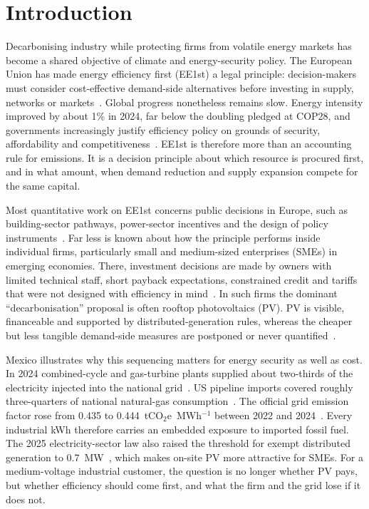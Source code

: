 \documentclass[processes,article,submit,pdftex,moreauthors]{Definitions/mdpi}
\begin{document}
\section{Introduction}
\label{sec:intro}

Decarbonising industry while protecting firms from volatile energy markets has become a shared objective of climate and energy-security policy. The European Union has made energy efficiency first (EE1st) a legal principle: decision-makers must consider cost-effective demand-side alternatives before investing in supply, networks or markets~\cite{eu2023eed,ec2021ee1st,ec2024ee1st}. Global progress nonetheless remains slow. Energy intensity improved by about 1\% in 2024, far below the doubling pledged at COP28, and governments increasingly justify efficiency policy on grounds of security, affordability and competitiveness~\cite{iea2024ee,iea2025ee}. EE1st is therefore more than an accounting rule for emissions. It is a decision principle about which resource is procured first, and in what amount, when demand reduction and supply expansion compete for the same capital.

Most quantitative work on EE1st concerns public decisions in Europe, such as building-sector pathways, power-sector incentives and the design of policy instruments~\cite{mandel2022,pato2022,mandel2023,mandel2024}. Far less is known about how the principle performs inside individual firms, particularly small and medium-sized enterprises (SMEs) in emerging economies. There, investment decisions are made by owners with limited technical staff, short payback expectations, constrained credit and tariffs that were not designed with efficiency in mind~\cite{cagno2013,trianni2017,kalantzis2019,zhang2025credit,herce2024}. In such firms the dominant ``decarbonisation'' proposal is often rooftop photovoltaics (PV). PV is visible, financeable and supported by distributed-generation rules, whereas the cheaper but less tangible demand-side measures are postponed or never quantified~\cite{fleiter2012,thollander2025}.

Mexico illustrates why this sequencing matters for energy security as well as cost. In 2024 combined-cycle and gas-turbine plants supplied about two-thirds of the electricity injected into the national grid~\cite{sener2025plan}. US pipeline imports covered roughly three-quarters of national natural-gas consumption~\cite{eia2025mexico}. The official grid emission factor rose from 0.435 to 0.444~tCO$_2$e~MWh$^{-1}$ between 2022 and 2024~\cite{cre2023fesen2022,cre2024fesen2023,semarnat2025fesen}. Every industrial kWh therefore carries an embedded exposure to imported fossil fuel. The 2025 electricity-sector law also raised the threshold for exempt distributed generation to 0.7~MW~\cite{lse2025}, which makes on-site PV more attractive for SMEs. For a medium-voltage industrial customer, the question is no longer whether PV pays, but whether efficiency should come first, and what the firm and the grid lose if it does not.
\end{document}
